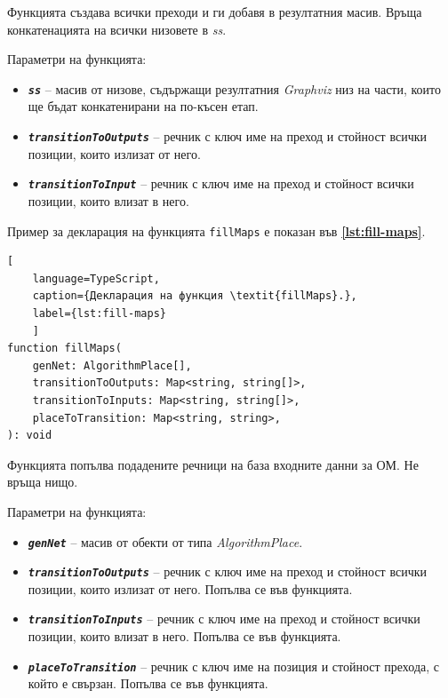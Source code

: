 Функцията създава всички преходи и ги добавя в резултатния масив. Връща конкатенацията на всички низовете в \textit{ss}.

Параметри на функцията:

\vspace{-0.3cm}

\begin{itemize}
	\item \texttt{\textbf{\textit{ss}}} -- масив от низове, съдържащи резултатния \textit{Graphviz} низ на части, които ще бъдат конкатенирани на по-късен етап.
	\item \texttt{\textbf{\textit{transitionToOutputs}}} -- речник с ключ име на преход и стойност всички позиции, които излизат от него.
	\item \texttt{\textbf{\textit{transitionToInput}}} -- речник с ключ име на преход и стойност всички позиции, които влизат в него.
\end{itemize}

\vspace{0.55cm}
Пример за декларация на функцията \texttt{fillMaps} е показан във \textbf{\autoref{lst:fill-maps}}.
\begin{lstlisting}[
	language=TypeScript,
	caption={Декларация на функция \textit{fillMaps}.},
	label={lst:fill-maps}
	]
function fillMaps(
    genNet: AlgorithmPlace[],
    transitionToOutputs: Map<string, string[]>,
    transitionToInputs: Map<string, string[]>,
    placeToTransition: Map<string, string>,
): void
\end{lstlisting}

Функцията попълва подадените речници на база входните данни за ОМ. Не връща нищо.

Параметри на функцията:

\vspace{-0.3cm}

\begin{itemize}
	\item \texttt{\textbf{\textit{genNet}}} -- масив от обекти от типа \textit{AlgorithmPlace}.
	\item \texttt{\textbf{\textit{transitionToOutputs}}} -- речник с ключ име на преход и стойност всички позиции, които излизат от него. Попълва се във функцията.
	\item \texttt{\textbf{\textit{transitionToInputs}}} -- речник с ключ име на преход и стойност всички позиции, които влизат в него. Попълва се във функцията.
	\item \texttt{\textbf{\textit{placeToTransition}}} -- речник с ключ име на позиция и стойност прехода, с който е свързан. Попълва се във функцията.
\end{itemize}

